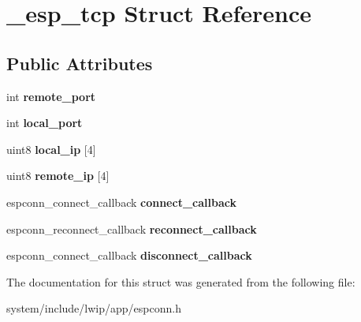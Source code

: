 \hypertarget{struct__esp__tcp}{}\section{\+\_\+esp\+\_\+tcp Struct Reference}
\label{struct__esp__tcp}
\subsection*{Public Attributes}
\begin{DoxyCompactItemize}
\item 
\hypertarget{struct__esp__tcp_aec114eb2d15ee20ff480edbef2fabd8e}{}int {\bfseries remote\+\_\+port}\label{struct__esp__tcp_aec114eb2d15ee20ff480edbef2fabd8e}

\item 
\hypertarget{struct__esp__tcp_aef023538162454b2b0c395fd171355ee}{}int {\bfseries local\+\_\+port}\label{struct__esp__tcp_aef023538162454b2b0c395fd171355ee}

\item 
\hypertarget{struct__esp__tcp_a22605d79649b0e540798968c59be4a04}{}uint8 {\bfseries local\+\_\+ip} \mbox{[}4\mbox{]}\label{struct__esp__tcp_a22605d79649b0e540798968c59be4a04}

\item 
\hypertarget{struct__esp__tcp_a5897411486d4a5845cebf9a18297d4dd}{}uint8 {\bfseries remote\+\_\+ip} \mbox{[}4\mbox{]}\label{struct__esp__tcp_a5897411486d4a5845cebf9a18297d4dd}

\item 
\hypertarget{struct__esp__tcp_a98f0e3db3910a3fdd164f6bd76fde7f8}{}espconn\+\_\+connect\+\_\+callback {\bfseries connect\+\_\+callback}\label{struct__esp__tcp_a98f0e3db3910a3fdd164f6bd76fde7f8}

\item 
\hypertarget{struct__esp__tcp_a8e711e7ac9861a99d1cf3a611230e577}{}espconn\+\_\+reconnect\+\_\+callback {\bfseries reconnect\+\_\+callback}\label{struct__esp__tcp_a8e711e7ac9861a99d1cf3a611230e577}

\item 
\hypertarget{struct__esp__tcp_ab82fe67a0c2f594f1d807b3aa769ef49}{}espconn\+\_\+connect\+\_\+callback {\bfseries disconnect\+\_\+callback}\label{struct__esp__tcp_ab82fe67a0c2f594f1d807b3aa769ef49}

\end{DoxyCompactItemize}


The documentation for this struct was generated from the following file\+:\begin{DoxyCompactItemize}
\item 
system/include/lwip/app/espconn.\+h\end{DoxyCompactItemize}
